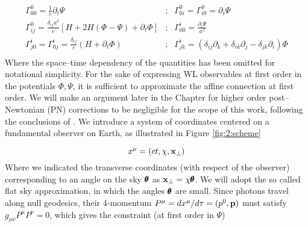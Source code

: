 \begin{equation}
\label{eq:2:connection}
\begin{matrix}
\Gamma_{00}^0 = \frac{1}{c}\partial_t\Psi & ; & \Gamma_{0i}^0=\Gamma_{i0}^0 = \partial_i\Psi \\  
\Gamma_{ij}^0 = \frac{\delta_{ij}a^2}{c}[H+2H(\Phi-\Psi)+\partial_t\Phi] & ; & \Gamma_{00}^i = \frac{\partial_i \Psi}{a^2} \\
\Gamma^i_{j0} = \Gamma^i_{0j} = \frac{\delta_{ij}}{c}(H+\partial_t\Phi) & ; & \Gamma_{jk}^i = (\delta_{ij}\partial_k+\delta_{ik}\partial_j-\delta_{jk}\partial_i)\Phi\\
\end{matrix}
\end{equation}
%
Where the space--time dependency of the quantities has been omitted for notational simplicity. For the sake of expressing WL observables at first order in the potentials $\Phi,\Psi$, it is sufficient to approximate the affine connection at first order. We will make an argument later in the Chapter for higher order post--Newtonian (PN) corrections to be negligible for the scope of this work, following the conclusions of \citep{PNLensing}. We introduce a system of coordinates centered on a fundamental observer on Earth, as illustrated in Figure \ref{fig:2:scheme}

\begin{equation}
\label{eq:2:coord}
x^{\mu} = (ct,\chi,\mathbf{x}_\perp)
\end{equation}
%
Where we indicated the transverse coordinates (with respect of the observer) corresponding to an angle on the sky $\pmb{\theta}$ as $\mathbf{x}_\perp=\chi\pmb{\theta}$. We will adopt the so called flat sky approximation, in which the angles $\pmb{\theta}$ are small. Since photons travel along null geodesics, their 4-momentum $P^\mu=dx^\mu/d\tau=(p^0,\mathbf{p})$ must satisfy $g_{\mu\nu}P^{\mu}P^{\nu}=0$, which gives the constraint (at first order in $\Psi$)

